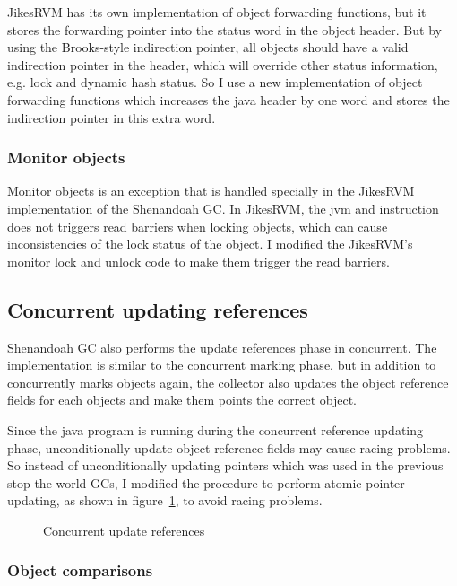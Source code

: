 JikesRVM has its own implementation of object forwarding functions, but it stores the forwarding
pointer into the status word in the object header. But by using the Brooks-style indirection
pointer, all objects should have a valid indirection pointer in the header, which will override other status
information, e.g. lock and dynamic hash status. So I use a new implementation of
object forwarding functions which increases the java header by one word and stores the indirection
pointer in this extra word.

\subsubsection{Monitor objects}

Monitor objects is an exception that is handled specially in the JikesRVM implementation of the Shenandoah GC.
In JikesRVM, the jvm  and  instruction
does not triggers read barriers when locking objects, which can cause inconsistencies 
of the lock status of the object. I modified the JikesRVM's monitor lock and unlock
code to make them trigger the read barriers.

\subsection{Concurrent updating references}

Shenandoah GC also performs the update references phase in concurrent.
The implementation is similar to the concurrent marking phase, but in addition to
concurrently marks objects again, the collector also updates the object reference fields
for each objects and make them points the correct object.

Since the java program is running during the concurrent reference updating phase,
unconditionally update object reference fields may cause racing problems. So instead of
unconditionally updating pointers which was used in the previous stop-the-world GCs,
I modified the procedure to perform
atomic pointer updating, as shown in figure~\ref{fig:concupdaterefs},
to avoid racing problems.

\begin{figure}
  \centering
  
  \caption{Concurrent update references}
  \label{fig:concupdaterefs}
\end{figure}

\subsubsection{Object comparisons}

